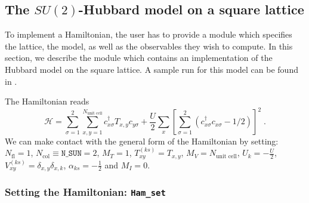 
\subsection{The $SU(2)$-Hubbard model on a square lattice}\label{sec:walk1}

To implement a Hamiltonian, the user has to provide  a module   which  specifies the lattice, the model, as well as the observables  they wish to compute. 
In this section, we describe the module 
 which contains an implementation of the Hubbard model on the square lattice. 
A sample run for this model can be found in .

The Hamiltonian reads 
\begin{equation}
\label{eqn_hubbard_sun}
\mathcal{H}= 
\sum\limits_{\sigma=1}^{2} 
\sum\limits_{x,y =1 }^{N_{\text{unit cell}}} 
  c^{\dagger}_{x \sigma} T_{x,y}c^{\phantom\dagger}_{y \sigma} 
+ \frac{U}{2}\sum\limits_{x}\left[
\sum\limits_{\sigma=1}^{2}
\left(  c^{\dagger}_{x \sigma} c^{\phantom\dagger}_{x \sigma}  -1/2 \right) \right]^{2}\;.
\end{equation} 
We can make contact with the general form of the Hamiltonian by setting: 
$N_{\mathrm{fl}} = 1$, $N_{\mathrm{col}} \equiv \texttt{N\_SUN}     =2 $,   $M_T    =    1$,  $T^{(ks)}_{x y}   =  T_{x,y}$,  $M_V   =  N_{\text{unit cell}} $,  $U_{k}       =   -\frac{U}{2}$, 
 $V_{x y}^{(ks)} =  \delta_{x,y} \delta_{x,k}$,  $\alpha_{ks}   = - \frac{1}{2}  $ and $M_I       = 0 $.

\subsubsection{Setting the Hamiltonian:  \texttt{Ham\_set} }

